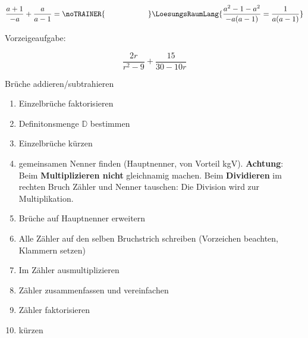 \begin{beispiel}{}{}
$$\frac{a+1}{-a} + \frac{a}{a-1} = \noTRAINER{\hspace{2cm}}\LoesungsRaumLang{ \frac{a^2 - 1 - a^2}{-a(a-1)} = \frac{1}{a(a-1)}}$$
\end{beispiel}

\TNTeop{}%
\newpage

Vorzeigeaufgabe:

$$\frac{2r}{r^2-9} + \frac{15}{30-10r}$$


\begin{rezept}{Brüche addieren/subtrahieren}{}\label{bruchtermeRezept}
\begin{enumerate}
	\item Einzelbrüche faktorisieren
  \item Definitonsmenge $\mathbb{D}$ bestimmen
	\item Einzelbrüche kürzen
	\item gemeinsamen Nenner finden (Hauptnenner, von Vorteil
	kgV). \textbf{Achtung}: Beim \textbf{Multiplizieren nicht}
	gleichnamig machen. Beim \textbf{Dividieren} im rechten Bruch Zähler
	und Nenner tauschen: Die Division wird zur Multiplikation.
	\item Brüche auf Hauptnenner erweitern
	\item Alle Zähler auf den selben Bruchstrich schreiben (Vorzeichen beachten, Klammern setzen)
	\item Im Zähler ausmultiplizieren
	\item Zähler zusammenfassen und vereinfachen
	\item Zähler faktorisieren
	\item kürzen
\end{enumerate}
\end{rezept}

